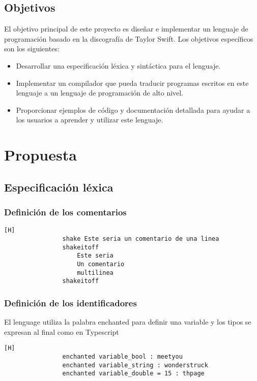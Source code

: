 \documentclass{article}
\begin{document}
    \subsection{Objetivos}
        El objetivo principal de este proyecto es diseñar e implementar un lenguaje de programación basado en la discografía de Taylor Swift. Los objetivos específicos son los siguientes:
        \begin{itemize}
            \item Desarrollar una especificación léxica y sintáctica para el lenguaje.
            \item Implementar un compilador que pueda traducir programas escritos en este lenguaje a un lenguaje de programación de alto nivel.
            \item Proporcionar ejemplos de código y documentación detallada para ayudar a los usuarios a aprender y utilizar este lenguaje.
        \end{itemize}

        \section{Propuesta}
            \subsection{Especificación léxica}
                \subsubsection{Definición de los comentarios}
                \begin{lstlisting}[caption={Comentarios}][H]
                shake Este seria un comentario de una linea
                shakeitoff
                    Este seria
                    Un comentario
                    multilinea
                shakeitoff
                \end{lstlisting}
                
                \subsubsection{Definición de los identificadores}
                El lenguage utiliza la palabra enchanted para definir una variable y los tipos se expresan al final como en Typescript
                \begin{lstlisting}[caption={Identificadores}][H]
                enchanted variable_bool : meetyou
                enchanted variable_string : wonderstruck
                enchanted variable_double = 15 : thpage 
                \end{lstlisting}
                
\end{document}
